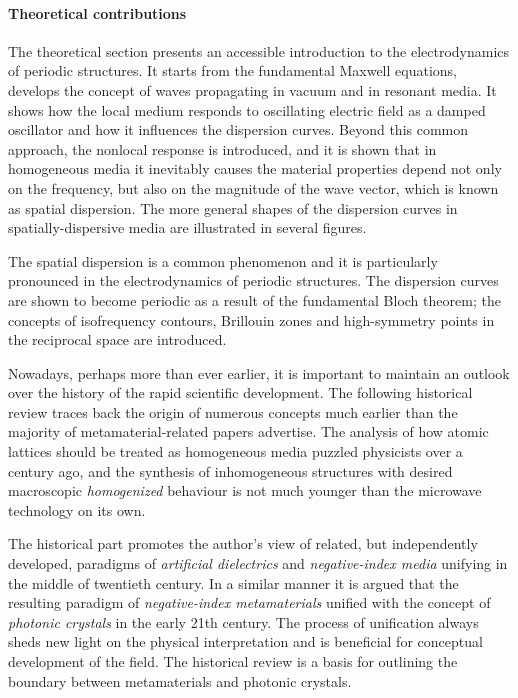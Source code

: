 \paragraph{Theoretical contributions}
The theoretical section presents an accessible introduction to the electrodynamics of periodic structures. It starts from the fundamental Maxwell equations, develops the concept of waves propagating in vacuum and in resonant media. It shows how the local medium responds to oscillating electric field as a damped oscillator and how it influences the dispersion curves. Beyond this common approach, the nonlocal response is introduced, and it is shown that in homogeneous media it inevitably causes the material properties depend not only on the frequency, but also on the magnitude of the wave vector, which is known as spatial dispersion. The more general shapes of the dispersion curves in spatially-dispersive media are illustrated in several figures. 

The spatial dispersion is a common phenomenon and it is particularly pronounced in the electrodynamics of periodic structures. The dispersion curves are shown to become periodic as a result of the fundamental Bloch theorem; the concepts of isofrequency contours, Brillouin zones and high-symmetry points in the reciprocal space are introduced.  %

Nowadays, perhaps more than ever earlier, it is important to maintain an outlook over the history of the rapid scientific development. The following historical review traces back the origin of numerous concepts much earlier than the majority of metamaterial-related papers advertise. The analysis of how atomic lattices should be treated as homogeneous media puzzled physicists over a century ago, and the synthesis of inhomogeneous structures with desired macroscopic \textit{homogenized} behaviour is not much younger than the microwave technology on its own.

The historical part promotes the author's view of related, but independently developed, paradigms of \textit{artificial dielectrics} and \textit{negative-index media} unifying in the middle of twentieth century. In a similar manner it is argued that the resulting paradigm of \textit{negative-index metamaterials} unified with the concept of \textit{photonic crystals} in the early 21th century. The process of unification always sheds new light on the physical interpretation and is beneficial for conceptual development of the field. The historical review is a basis for outlining the boundary between metamaterials and photonic crystals.

